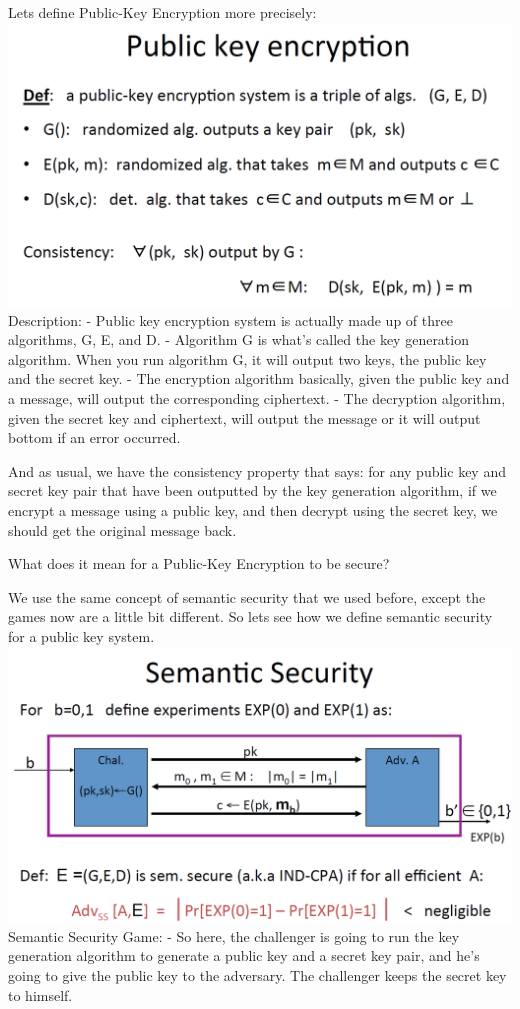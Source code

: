 \documentclass[11pt]{article}
\makeatletter
\def\maxwidth{\ifdim\Gin@nat@width>\linewidth\linewidth
    \else\Gin@nat@width\fi}
\let\Oldincludegraphics\includegraphics
\renewcommand{\includegraphics}[1]{\Oldincludegraphics[width=.8\maxwidth]{#1}}
\makeatother
\begin{document}
Lets define Public-Key Encryption more precisely:
\includegraphics{./Images/PKEnc-Formally.png} Description: - Public key
encryption system is actually made up of three algorithms, G, E, and D.
- Algorithm G is what's called the key generation algorithm. When you
run algorithm G, it will output two keys, the public key and the secret
key. - The encryption algorithm basically, given the public key and a
message, will output the corresponding ciphertext. - The decryption
algorithm, given the secret key and ciphertext, will output the message
or it will output bottom if an error occurred.

And as usual, we have the consistency property that says: for any public
key and secret key pair that have been outputted by the key generation
algorithm, if we encrypt a message using a public key, and then decrypt
using the secret key, we should get the original message back.

What does it mean for a Public-Key Encryption to be secure?

We use the same concept of semantic security that we used before, except
the games now are a little bit different. So lets see how we define
semantic security for a public key system.
\includegraphics{./Images/PKEnc-SemanSecurity.png} Semantic Security
Game: - So here, the challenger is going to run the key generation
algorithm to generate a public key and a secret key pair, and he's going
to give the public key to the adversary. The challenger keeps the secret
key to himself.
\end{document}

